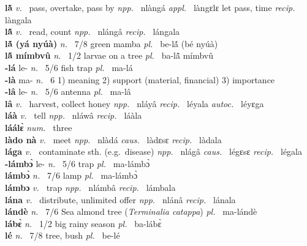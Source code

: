 \noindent
{\bfseries lã̀}  {\itshape v.~} pass, overtake, pass by   {\itshape npp.~} nlàngá {\itshape appl.~} làngɛlɛ let pass, time {\itshape recip.~} làngala \\ 
{\bfseries lã̂}  {\itshape v.~} read, count   {\itshape npp.~} nlángâ {\itshape recip.~} lángala \\ 
{\bfseries lã́ (yá nyúà)}  {\itshape n.~} 7/8 green mamba {\itshape pl.~} be-lã́ (bé nyúà)    \\ 
{\bfseries lã̂ mímbvû}  {\itshape n.~} 1/2 larvae on a tree {\itshape pl.~} ba-lã̂ mímbvû    \\ 
{\bfseries -lá} le- {\itshape n.~} 5/6 fish trap {\itshape pl.~} ma-lá    \\ 
{\bfseries -là} ma- {\itshape n.~} 6 1) meaning 2) support (material, financial) 3) importance    \\ 
{\bfseries -lâ} le- {\itshape n.~} 5/6 antenna {\itshape pl.~} ma-lâ    \\ 
{\bfseries lâ}  {\itshape v.~} harvest, collect honey   {\itshape npp.~} nláyâ {\itshape recip.~} léyala {\itshape autoc.~} léyɛga  \\ 
{\bfseries láà}  {\itshape v.~} tell    {\itshape npp.~} nláwâ {\itshape recip.~} láàla  \\ 
{\bfseries láálɛ̀}  {\itshape num.~} three    \\ 
{\bfseries làdo nà}  {\itshape v.~} meet   {\itshape npp.~} nlàdá {\itshape caus.~} làdɛsɛ {\itshape recip.~} làdala  \\ 
{\bfseries lága}  {\itshape v.~} contaminate sth. (e.g.\ disease)   {\itshape npp.~} nlágâ {\itshape caus.~} légɛsɛ {\itshape recip.~} légala  \\ 
{\bfseries -lámbɔ̀} le- {\itshape n.~} 5/6 trap {\itshape pl.~} ma-lámbɔ̀    \\ 
{\bfseries lámbɔ̀}  {\itshape n.~} 7/6 lamp {\itshape pl.~} ma-lámbɔ̀    \\ 
{\bfseries lámbɔ}  {\itshape v.~} trap   {\itshape npp.~} nlámbâ {\itshape recip.~} lámbala  \\ 
{\bfseries lána}  {\itshape v.~} distribute, unlimited offer   {\itshape npp.~} nlánâ {\itshape recip.~} lánala  \\ 
{\bfseries lándè}  {\itshape n.~} 7/6 Sea almond tree ({\itshape Terminalia catappa}) {\itshape pl.~} ma-lándè    \\ 
{\bfseries lábɛ̀}   {\itshape n.~} 1/2 big rainy season {\itshape pl.~} ba-lábɛ̀    \\ 
{\bfseries lé}  {\itshape n.~} 7/8 tree, bush {\itshape pl.~} be-lé    \\ 
